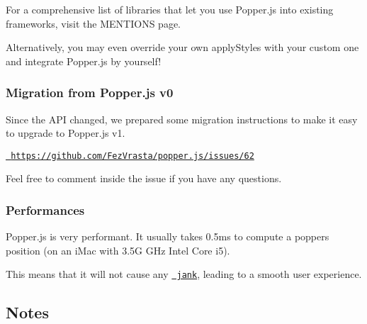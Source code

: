 For a comprehensive list of libraries that let you use Popper.\+js into existing frameworks, visit the M\+E\+N\+T\+I\+O\+NS page.

Alternatively, you may even override your own {\ttfamily apply\+Styles} with your custom one and integrate Popper.\+js by yourself!


\begin{DoxyCode}{0}
\DoxyCodeLine{\};}
\DoxyCodeLine{}
\DoxyCodeLine{        \},}
\DoxyCodeLine{    \},}
\DoxyCodeLine{\});}
\end{DoxyCode}


\subsubsection*{Migration from Popper.\+js v0}

Since the A\+PI changed, we prepared some migration instructions to make it easy to upgrade to Popper.\+js v1.

\href{https://github.com/FezVrasta/popper.js/issues/62}{\texttt{ https\+://github.\+com/\+Fez\+Vrasta/popper.\+js/issues/62}}

Feel free to comment inside the issue if you have any questions.

\subsubsection*{Performances}

Popper.\+js is very performant. It usually takes 0.\+5ms to compute a popper\textquotesingle{}s position (on an i\+Mac with 3.\+5G G\+Hz Intel Core i5).

This means that it will not cause any \href{https://www.chromium.org/developers/how-tos/trace-event-profiling-tool/anatomy-of-jank}{\texttt{ jank}}, leading to a smooth user experience.

\subsection*{Notes}

